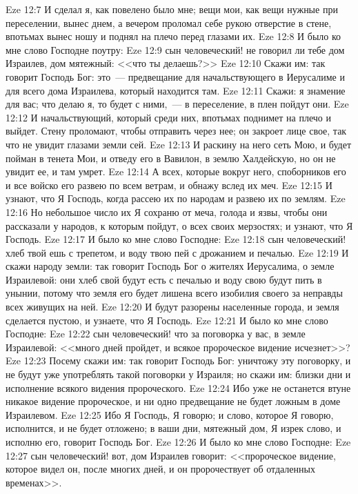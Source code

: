 \vs Eze 12:7 И сделал я, как повелено было мне; вещи мои, как вещи нужные при переселении, вынес днем, а вечером проломал себе рукою отверстие в стене, впотьмах вынес ношу и поднял на плечо перед глазами их.
\vs Eze 12:8 И было ко мне слово Господне поутру:
\vs Eze 12:9 сын человеческий! не говорил ли тебе дом Израилев, дом мятежный: <<что ты делаешь?>>
\vs Eze 12:10 Скажи им: так говорит Господь Бог: это~--- предвещание для начальствующего в Иерусалиме и для всего дома Израилева, который находится там.
\vs Eze 12:11 Скажи: я знамение для вас; что делаю я, то будет с ними,~--- в переселение, в плен пойдут они.
\vs Eze 12:12 И начальствующий, который среди них, впотьмах поднимет  на плечо и выйдет. Стену проломают, чтобы отправить  через нее; он закроет лице свое, так что не увидит глазами земли сей.
\vs Eze 12:13 И раскину на него сеть Мою, и будет пойман в тенета Мои, и отведу его в Вавилон, в землю Халдейскую, но он не увидит ее, и там умрет.
\vs Eze 12:14 А всех, которые вокруг него, споборников его и все войско его развею по всем ветрам, и обнажу вслед их меч.
\vs Eze 12:15 И узнают, что Я Господь, когда рассею их по народам и развею их по землям.
\vs Eze 12:16 Но небольшое число их Я сохраню от меча, голода и язвы, чтобы они рассказали у народов, к которым пойдут, о всех своих мерзостях; и узнают, что Я Господь.
\vs Eze 12:17 И было ко мне слово Господне:
\vs Eze 12:18 сын человеческий! хлеб твой ешь с трепетом, и воду твою пей с дрожанием и печалью.
\vs Eze 12:19 И скажи народу земли: так говорит Господь Бог о жителях Иерусалима, о земле Израилевой: они хлеб свой будут есть с печалью и воду свою будут пить в унынии, потому что земля его будет лишена всего изобилия своего за неправды всех живущих на ней.
\vs Eze 12:20 И будут разорены населенные города, и земля сделается пустою, и узнаете, что Я Господь.
\vs Eze 12:21 И было ко мне слово Господне:
\vs Eze 12:22 сын человеческий! что за поговорка у вас, в земле Израилевой: <<много дней пройдет, и всякое пророческое видение исчезнет>>?
\vs Eze 12:23 Посему скажи им: так говорит Господь Бог: уничтожу эту поговорку, и не будут уже употреблять такой поговорки у Израиля; но скажи им: близки дни и исполнение всякого видения пророческого.
\vs Eze 12:24 Ибо уже не останется втуне никакое видение пророческое, и ни одно предвещание не будет ложным в доме Израилевом.
\vs Eze 12:25 Ибо Я Господь, Я говорю; и слово, которое Я говорю, исполнится, и не будет отложено; в ваши дни, мятежный дом, Я изрек слово, и исполню его, говорит Господь Бог.
\vs Eze 12:26 И было ко мне слово Господне:
\vs Eze 12:27 сын человеческий! вот, дом Израилев говорит: <<пророческое видение, которое видел он,  после многих дней, и он пророчествует об отдаленных временах>>.
